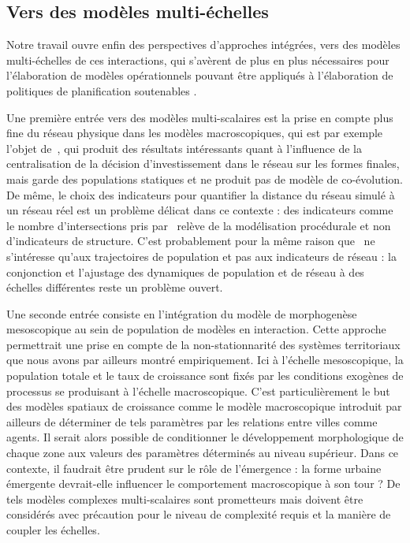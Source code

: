 \documentclass[11pt]{article}
\begin{document}
\subsection{Vers des modèles multi-échelles}


Notre travail ouvre enfin des perspectives d'approches intégrées, vers des modèles multi-échelles de ces interactions, qui s'avèrent de plus en plus nécessaires pour l'élaboration de modèles opérationnels pouvant être appliqués à l'élaboration de politiques de planification soutenables \citep{rozenblat2018conclusion}.


Une première entrée vers des modèles multi-scalaires est la prise en compte plus fine du réseau physique dans les modèles macroscopiques, qui est par exemple l'objet de~\cite{mimeur:tel-01451164}, qui produit des résultats intéressants quant à l'influence de la centralisation de la décision d'investissement dans le réseau sur les formes finales, mais garde des populations statiques et ne produit pas de modèle de co-évolution. De même, le choix des indicateurs pour quantifier la distance du réseau simulé à un réseau réel est un problème délicat dans ce contexte : des indicateurs comme le nombre d'intersections pris par~\cite{mimeur:tel-01451164} relève de la modélisation procédurale et non d'indicateurs de structure. C'est probablement pour la même raison que~\cite{schmitt2014modelisation} ne s'intéresse qu'aux trajectoires de population et pas aux indicateurs de réseau : la conjonction et l'ajustage des dynamiques de population et de réseau à des échelles différentes reste un problème ouvert.

Une seconde entrée consiste en l'intégration du modèle de morphogenèse mesoscopique au sein de population de modèles en interaction. Cette approche permettrait une prise en compte de la non-stationnarité des systèmes territoriaux que nous avons par ailleurs montré empiriquement.
 Ici à l'échelle mesoscopique, la population totale et le taux de croissance sont fixés par les conditions exogènes de processus se produisant à l'échelle macroscopique. C'est particulièrement le but des modèles spatiaux de croissance comme le modèle macroscopique introduit par ailleurs de déterminer de tels paramètres par les relations entre villes comme agents. Il serait alors possible de conditionner le développement morphologique de chaque zone aux valeurs des paramètres déterminés au niveau supérieur. Dans ce contexte, il faudrait être prudent sur le rôle de l'émergence : la forme urbaine émergente devrait-elle influencer le comportement macroscopique à son tour ? De tels modèles complexes multi-scalaires sont prometteurs mais doivent être considérés avec précaution pour le niveau de complexité requis et la manière de coupler les échelles.
\end{document}
